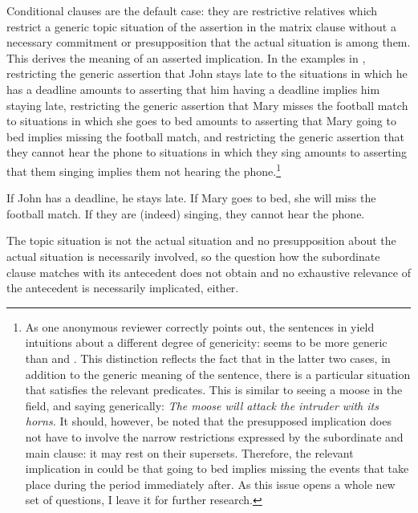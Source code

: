 \documentclass[output=paper,
colorlinks,
citecolor=brown,
newtxmath
]{langscibook}
\begin{document}
Conditional clauses are the default case: they are restrictive relatives which restrict a generic topic situation of the assertion in the matrix clause without a necessary commitment or presupposition that the actual situation is among them. This derives the meaning of an asserted implication. In the examples in , restricting the generic assertion that John stays late to the situations in which he has a deadline amounts to asserting that him having a deadline implies him staying late, restricting the generic assertion that Mary misses the football match to situations in which she goes to bed amounts to asserting that Mary going to bed implies missing the football match, and restricting the generic assertion that they cannot hear the phone to situations in which they sing amounts to asserting that them singing implies them not hearing the phone.\footnote{As one anonymous reviewer correctly points out, the sentences in  yield intuitions about a different degree of genericity:  seems to be more generic than  and . This distinction reflects the fact that in the latter two cases, in addition to the generic meaning of the sentence, there is a particular situation that satisfies the relevant predicates. This is similar to seeing a moose in the field, and saying generically: \textit{The moose will attack the intruder with its horns.} It should, however, be noted that the presupposed implication does not have to involve the narrow restrictions expressed by the subordinate and main clause: it may rest on their supersets. Therefore, the relevant implication in  could be that going to bed implies missing the events that take place during the period immediately after. As this issue opens a whole new set of questions, I leave it for further research.}

\ea\label{ex:Cond2}
\ea If John has a deadline, he stays late.\label{ex:Cond2-a}
\ex If Mary goes to bed, she will miss the football match.\label{ex:Cond2-b}
\ex If they are (indeed) singing, they cannot hear the phone.\label{ex:Cond2-c}
\z\z

\noindent The topic situation is not the actual situation and no presupposition about the actual situation is necessarily involved, so the question how the subordinate clause matches with its antecedent does not obtain and no exhaustive relevance of the antecedent is necessarily implicated, either.

\largerpage[-1] %
\end{document}
